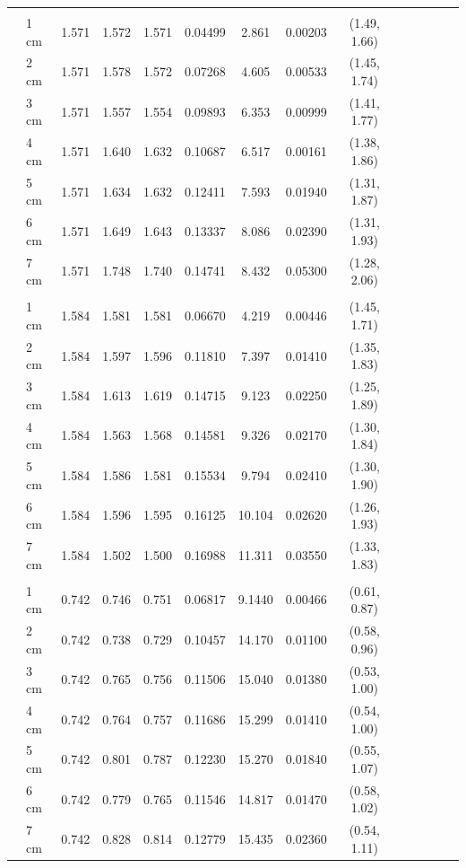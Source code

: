 \documentclass[a4paper 12pt]{article}
\numberwithin{equation}{section}
\begin{document}
\begin{small}
\begin{table}[h!]
\begin{footnotesize}
\begin{tabular}{clclclclclclcl}
 \raisebox{1ex}{\bf age 3}  \\ [1.0ex]
&   1 cm & 1.571 &    1.572  & 1.571 &         0.04499& 2.861  & 0.00203 & (1.49, 1.66)\\
&   2 cm & 1.571 &    1.578  & 1.572 &         0.07268& 4.605  & 0.00533 & (1.45, 1.74)\\
&   3 cm & 1.571 &    1.557  & 1.554 &         0.09893& 6.353  & 0.00999 & (1.41, 1.77)\\
&   4 cm & 1.571 &    1.640  & 1.632 &         0.10687& 6.517  & 0.00161 & (1.38, 1.86)\\
&   5 cm & 1.571 &    1.634  & 1.632 &         0.12411& 7.593  & 0.01940 & (1.31, 1.87)\\
&   6 cm & 1.571 &    1.649  & 1.643 &         0.13337& 8.086  & 0.02390 & (1.31, 1.93)\\
&   7 cm & 1.571 &    1.748  & 1.740 &         0.14741& 8.432  & 0.05300 & (1.28, 2.06) \\[1.5ex]

 \raisebox{1ex}{\bf age 4}  \\ [1.0ex]
&   1 cm & 1.584 &    1.581  & 1.581 &         0.06670& 4.219   & 0.00446 & (1.45, 1.71)\\
&   2 cm & 1.584 &    1.597  & 1.596 &         0.11810& 7.397   & 0.01410 & (1.35, 1.83)\\
&   3 cm & 1.584 &    1.613  & 1.619 &         0.14715& 9.123   & 0.02250 & (1.25, 1.89)\\
&   4 cm & 1.584 &    1.563  & 1.568 &         0.14581& 9.326   & 0.02170 & (1.30, 1.84)\\
&   5 cm & 1.584 &    1.586  & 1.581 &         0.15534& 9.794   & 0.02410 & (1.30, 1.90)\\
&   6 cm & 1.584 &    1.596  & 1.595 &         0.16125& 10.104  & 0.02620 & (1.26, 1.93)\\
&   7 cm & 1.584 &    1.502  & 1.500 &         0.16988& 11.311  & 0.03550 & (1.33, 1.83) \\[1.5ex]

 \raisebox{1ex}{\bf age 5}  \\ [1.0ex]
&   1 cm & 0.742 &    0.746 & 0.751 &          0.06817& 9.1440 & 0.00466 & (0.61, 0.87)\\
&   2 cm & 0.742 &    0.738 & 0.729 &          0.10457& 14.170 & 0.01100 & (0.58, 0.96)\\
&   3 cm & 0.742 &    0.765 & 0.756 &          0.11506& 15.040 & 0.01380 & (0.53, 1.00)\\
&   4 cm & 0.742 &    0.764 & 0.757 &          0.11686& 15.299 & 0.01410 & (0.54, 1.00)\\
&   5 cm & 0.742 &    0.801 & 0.787 &          0.12230& 15.270 & 0.01840 & (0.55, 1.07)\\
&   6 cm & 0.742 &    0.779 & 0.765 &          0.11546& 14.817 & 0.01470 & (0.58, 1.02)\\
&   7 cm & 0.742 &    0.828 & 0.814 &          0.12779& 15.435 & 0.02360 & (0.54, 1.11) \\[1.5ex]


\end{tabular}
\end{footnotesize}
\end{table}
\end{small}
\end{document}
